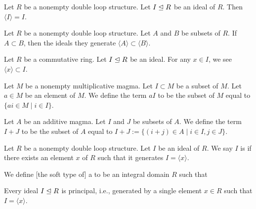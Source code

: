 \begin{theorem}
Let $R$ be a nonempty double loop structure.
Let $I\mathrel{\trianglelefteq} R$ be an ideal of $R$.
Then $\langle I\rangle=I$.
\end{theorem}

\begin{theorem}
Let $R$ be a nonempty double loop structure.
Let $A$ and $B$ be subsets of $R$.
If $A\subset B$, then the ideals they generate $\langle A\rangle\subset\langle B\rangle$.
\end{theorem}

\begin{theorem}
Let $R$ be a commutative ring.
Let $I\mathrel{\trianglelefteq} R$ be an ideal.
For any $x\in I$, we see $\langle x\rangle\subset I$.
\end{theorem}

\begin{definition}
Let $M$ be a nonempty multiplicative magma.
Let $I\subset M$ be a subset of $M$.
Let $a\in M$ be an element of $M$.
We define the term $aI$ to be the subset of $M$ equal to $\{ai\in M\mid i\in I\}$.
\end{definition}

\begin{definition}
Let $A$ be an additive magma.
Let $I$ and $J$ be subsets of $A$.
We define the term $I+J$ to be the subset of $A$ equal to
$I+J:=\{(i+j)\in A\mid i\in I, j\in J\}$.
\end{definition}

\begin{definition}
Let $R$ be a nonempty double loop structure.
Let $I$ be an ideal of $R$.
We say $I$ is  if there exists an element $x$ of $R$
such that it generates $I = \langle x\rangle$.
\end{definition}

\begin{definition}
We define [the soft type of] a  to be
an integral domain $R$ such that
\begin{itemize}
 Every ideal
$I\mathrel{\trianglelefteq} R$ is principal, i.e., generated by a single element $x\in R$
such that $I=\langle x\rangle$.
\end{itemize}
\end{definition}

